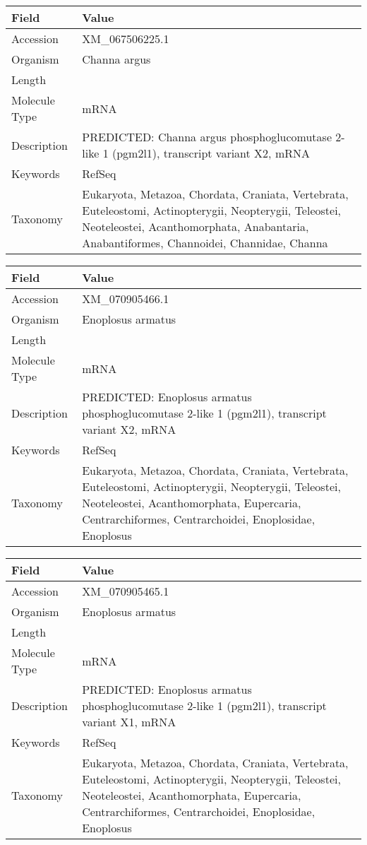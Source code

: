 \documentclass[10pt]{article}
\begin{document}
{\footnotesize
\begin{longtable}{>{\raggedright\arraybackslash}p{4.5cm} >{\raggedright\arraybackslash}p{11.5cm}}
\textbf{Field} & \textbf{Value} \\
\hline
Accession & XM\_067506225.1 \\
Organism & Channa argus \\
Length & 7132 \\
Molecule Type & mRNA \\
Description & PREDICTED: Channa argus phosphoglucomutase 2-like 1 (pgm2l1), transcript variant X2, mRNA \\
Keywords & RefSeq \\
Taxonomy & Eukaryota, Metazoa, Chordata, Craniata, Vertebrata, Euteleostomi, Actinopterygii, Neopterygii, Teleostei, Neoteleostei, Acanthomorphata, Anabantaria, Anabantiformes, Channoidei, Channidae, Channa \\
\end{longtable}
}

{\footnotesize
\begin{longtable}{>{\raggedright\arraybackslash}p{4.5cm} >{\raggedright\arraybackslash}p{11.5cm}}
\textbf{Field} & \textbf{Value} \\
\hline
Accession & XM\_070905466.1 \\
Organism & Enoplosus armatus \\
Length & 3375 \\
Molecule Type & mRNA \\
Description & PREDICTED: Enoplosus armatus phosphoglucomutase 2-like 1 (pgm2l1), transcript variant X2, mRNA \\
Keywords & RefSeq \\
Taxonomy & Eukaryota, Metazoa, Chordata, Craniata, Vertebrata, Euteleostomi, Actinopterygii, Neopterygii, Teleostei, Neoteleostei, Acanthomorphata, Eupercaria, Centrarchiformes, Centrarchoidei, Enoplosidae, Enoplosus \\
\end{longtable}
}

{\footnotesize
\begin{longtable}{>{\raggedright\arraybackslash}p{4.5cm} >{\raggedright\arraybackslash}p{11.5cm}}
\textbf{Field} & \textbf{Value} \\
\hline
Accession & XM\_070905465.1 \\
Organism & Enoplosus armatus \\
Length & 3653 \\
Molecule Type & mRNA \\
Description & PREDICTED: Enoplosus armatus phosphoglucomutase 2-like 1 (pgm2l1), transcript variant X1, mRNA \\
Keywords & RefSeq \\
Taxonomy & Eukaryota, Metazoa, Chordata, Craniata, Vertebrata, Euteleostomi, Actinopterygii, Neopterygii, Teleostei, Neoteleostei, Acanthomorphata, Eupercaria, Centrarchiformes, Centrarchoidei, Enoplosidae, Enoplosus \\
\end{longtable}
}
\end{document}
